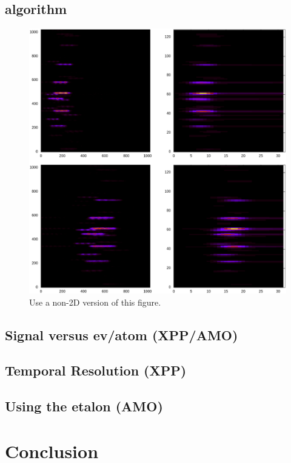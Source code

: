 \documentclass{article}
\newlength{\figwidth}
\begin{document}
\subsection{algorithm}
\begin{figure}
\centerline{\includegraphics[width=.5\figwidth]{plotting.ip_method_exp.eps}}
\caption{\label{fig::ip_mthod}Use a non-2D version of this figure.}
\end{figure}
\subsection{Signal versus ev/atom (XPP/AMO)}
\subsection{Temporal Resolution (XPP)}
\subsection{Using the etalon (AMO)}

\section{Conclusion}



\end{document}

